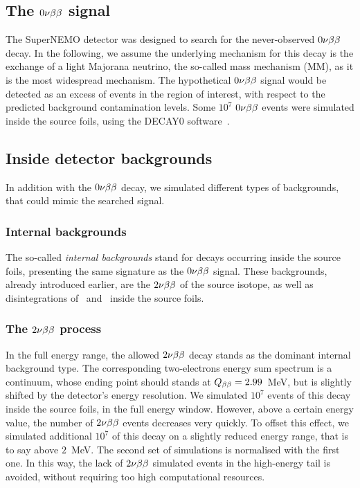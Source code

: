 
\subsection{The $0\nu\beta\beta$ signal}

The SuperNEMO detector was designed to search for the never-observed $0\nu\beta\beta$ decay.
In the following, we assume the underlying mechanism for this decay is the exchange of a light Majorana neutrino, the so-called mass mechanism (MM), as it is the most widespread mechanism.
The hypothetical $0\nu\beta\beta$ signal would be detected as an excess of events in the region of interest, with respect to the predicted background contamination levels.
Some $10^{7}$ $0\nu\beta\beta$ events were simulated inside the source foils, using the DECAY$0$ software~\cite{art:decay0}.

\subsection{Inside detector backgrounds}

In addition with the $0\nu\beta\beta$ decay, we simulated different types of backgrounds, that could mimic the searched signal.

\subsubsection{Internal backgrounds}

The so-called \emph{internal backgrounds} stand for decays occurring inside the source foils, presenting the same signature as the $0\nu\beta\beta$ signal.
These backgrounds, already introduced earlier, are the $2\nu\beta\beta$ of the source isotope, as well as disintegrations of \Tl\ and \Bi\ inside the source foils.

\subsubsection*{The $2\nu\beta\beta$ process}

In the full energy range, the allowed $2\nu\beta\beta$ decay stands as the dominant internal background type.
The corresponding two-electrons energy sum spectrum is a continuum, whose ending point should stands at $Q_{\beta\beta} = 2.99$~MeV, but is slightly shifted by the detector's energy resolution.
We simulated $10^{7}$ events of this decay inside the source foils, in the full energy window.
However, above a certain energy value, the number of $2\nu\beta\beta$ events decreases very quickly.
To offset this effect, we simulated additional $10^{7}$ of this decay on a slightly reduced energy range, that is to say above $2$~MeV.
The second set of simulations is normalised with the first one.
In this way, the lack of $2\nu\beta\beta$ simulated events in the high-energy tail is avoided, without requiring too high computational resources.

